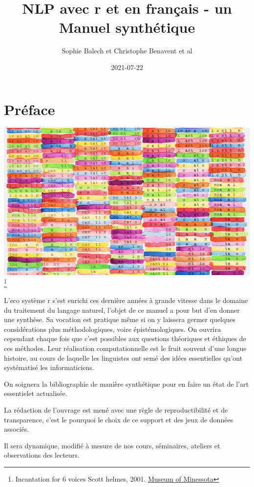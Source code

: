 \documentclass[
]{book}
\title{NLP avec r et en français - un Manuel synthétique}
\author{Sophie Balech et Christophe Benavent et al}
\date{2021-07-22}
\begin{document}
\maketitle

{
\setcounter{tocdepth}{1}
\tableofcontents
}
\hypertarget{pruxe9face}{%
\chapter{Préface}\label{pruxe9face}}

\includegraphics{./images/Incantationfor6voices_scotthelmes2001.jpeg}
\footnote{Incantation for 6 voices Scott helmes, 2001. \href{https://medium.com/minneapolis-institute-of-art/painting-a-picture-with-words-a0a3fef3cf63}{Museum of Minessota}}

L'eco système r s'est enrichi ces dernière années à grande vitesse dans le domaine du traitement du langage naturel, l'objet de ce manuel a pour but d'en donner une synthèse. Sa vocation est pratique même si on y laissera germer quelques considérations plus méthodologiques, voire épistémologiques.
On ouvrira cependant chaque fois que c'est possibles aux questions théoriques et éthiques de ces méthodes. Leur réalisation computationnelle est le fruit souvent d'une longue histoire, au cours de laquelle les linguistes ont semé des idées essentielles qu'ont systématisé les informaticiens.

On soignera la bibliographie de manière synthétique pour en faire un état de l'art essentielet actualisée.

La rédaction de l'ouvrage est mené avec une règle de reproductibilité et de transparence, c'est le pourquoi le choix de ce support et des jeux de données associés.

Il sera dynamique, modifié à mesure de nos cours, séminaires, ateliers et observations des lecteurs.
\end{document}
